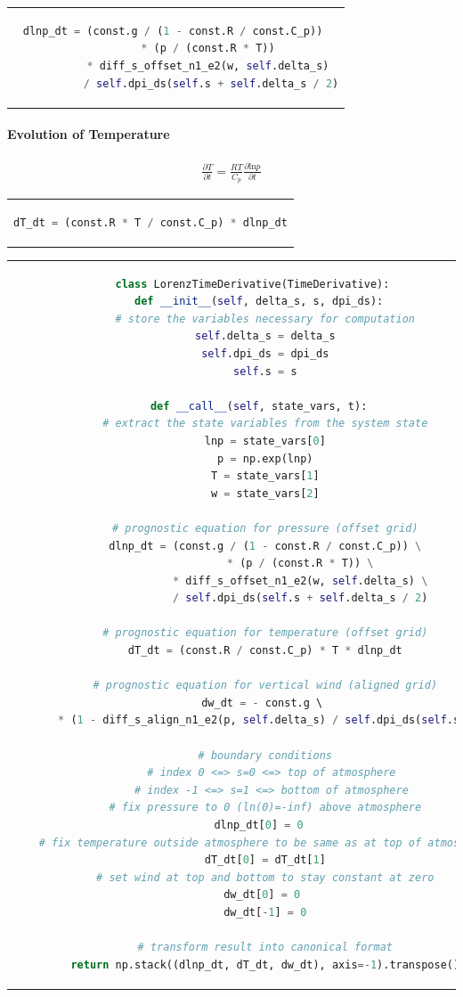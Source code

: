 \begin{center}
\begin{tabular}{c}
\begin{lstlisting}[language=Python]
dlnp_dt = (const.g / (1 - const.R / const.C_p)) 
           * (p / (const.R * T)) 
           * diff_s_offset_n1_e2(w, self.delta_s) 
           / self.dpi_ds(self.s + self.delta_s / 2)
\end{lstlisting}
\end{tabular}
\end{center}

\paragraph{Evolution of Temperature}
\begin{align*}
\frac{\partial T}{\partial t} = \frac{RT}{C_p}\frac{\partial \text{ln}p}{\partial t}
\end{align*}

\begin{center}
\begin{tabular}{c}
\begin{lstlisting}[language=Python]
dT_dt = (const.R * T / const.C_p) * dlnp_dt
\end{lstlisting}
\end{tabular}
\end{center}

\begin{tabular}{c}
\begin{lstlisting}[language=Python]
class LorenzTimeDerivative(TimeDerivative):
  def __init__(self, delta_s, s, dpi_ds):
    # store the variables necessary for computation
    self.delta_s = delta_s
    self.dpi_ds = dpi_ds
    self.s = s

  def __call__(self, state_vars, t):
    # extract the state variables from the system state
    lnp = state_vars[0]
    p = np.exp(lnp)
    T = state_vars[1]
    w = state_vars[2]
	
    # prognostic equation for pressure (offset grid)
    dlnp_dt = (const.g / (1 - const.R / const.C_p)) \
               * (p / (const.R * T)) \
               * diff_s_offset_n1_e2(w, self.delta_s) \
               / self.dpi_ds(self.s + self.delta_s / 2)
    
    # prognostic equation for temperature (offset grid)
    dT_dt = (const.R / const.C_p) * T * dlnp_dt
    
    # prognostic equation for vertical wind (aligned grid)
    dw_dt = - const.g \ 
    * (1 - diff_s_align_n1_e2(p, self.delta_s) / self.dpi_ds(self.s))
	
    # boundary conditions
      # index 0 <=> s=0 <=> top of atmosphere
      # index -1 <=> s=1 <=> bottom of atmosphere
    # fix pressure to 0 (ln(0)=-inf) above atmosphere
    dlnp_dt[0] = 0  
    # fix temperature outside atmosphere to be same as at top of atmosphere
    dT_dt[0] = dT_dt[1]
    # set wind at top and bottom to stay constant at zero
    dw_dt[0] = 0 
    dw_dt[-1] = 0

    # transform result into canonical format
    return np.stack((dlnp_dt, dT_dt, dw_dt), axis=-1).transpose()
\end{lstlisting}
\end{tabular}


